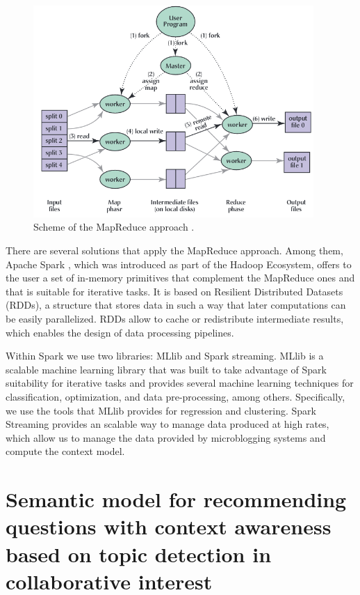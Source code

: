 \documentclass[preprint]{elsarticle}
\begin{document}
\begin{spacing}{1.5}
\begin{figure}[h]
	\centering
	\includegraphics[width=0.95\textwidth]{figures/mapreduce.png}
	\caption{Scheme of the MapReduce approach \cite{Dean2008}.}
	\label{fig:background-mapreduce}
\end{figure}

There are several solutions that apply the MapReduce approach. Among them, Apache Spark \cite{Zaharia2016}, which was introduced as part of the Hadoop Ecosystem, offers to the user a set of in-memory primitives that complement the MapReduce ones and that is suitable for iterative tasks. It is based on Resilient Distributed Datasets (RDDs), a structure that stores data in such a way that later computations can be easily parallelized. RDDs allow to cache or redistribute intermediate results, which enables the design of data processing pipelines.

Within Spark we use two libraries: MLlib and Spark streaming. MLlib is a scalable machine learning library \cite{Meng2016} that was built to take advantage of Spark suitability for iterative tasks and provides several machine learning techniques for classification, optimization, and data pre-processing, among others. Specifically, we use the tools that MLlib provides for regression and clustering. Spark Streaming \cite{Chintapalli2016} provides an scalable way to manage data produced at high rates, which allow us to manage the data provided by microblogging systems and compute the context model.

\section{Semantic model for recommending questions with context awareness based on topic detection in collaborative interest}
\label{sec:proposal}


\end{spacing}
\end{document}
